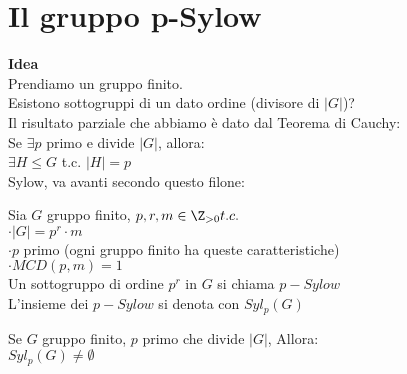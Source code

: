 \documentclass[12px]{article}
\begin{document}
	\section{Il gruppo p-Sylow}
	\textbf{Idea}\\
	Prendiamo un gruppo finito.\\
	Esistono sottogruppi di un dato ordine (divisore di $|G|$)?\\
	Il risultato parziale che abbiamo è dato dal Teorema di Cauchy:\\
	Se  $\exists p$ primo e divide  $|G|$, allora:\\
	 $\exists H\leq G$ t.c. $|H| = p$ \\
	 Sylow, va avanti secondo questo filone:\\\newpage
	 \begin{defi}
		 Sia $G$ gruppo finito, $p,r,m\in\Z_{>0} t.c.$\\
		  $\cdot |G| = p^r\cdot m$\\
		   $\cdot p$ primo \hfill (ogni gruppo finito ha queste caratteristiche)\\
		   $\cdot MCD(p,m) = 1$\\
	 Un sottogruppo di ordine $p^r$ in $G$ si chiama $p-Sylow$\\
	 L'insieme dei  $p-Sylow$ si denota con $Syl_p(G)$\\
	 \end{defi}
	 \begin{teo}
	 	Se $G$ gruppo finito, $p$ primo che divide $|G|$, Allora:\\
		 $Syl_p(G)\neq \emptyset$
	 \end{teo}
\end{document}
